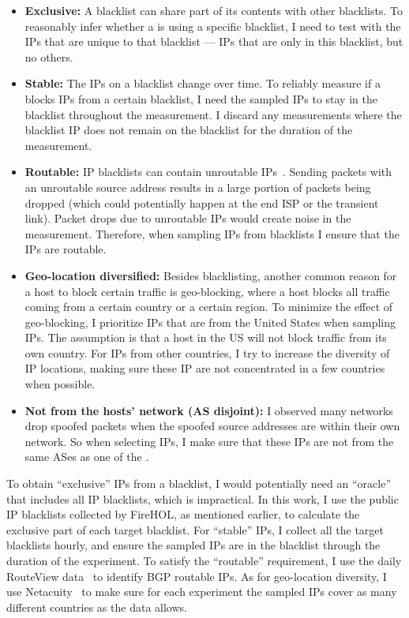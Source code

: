 \begin{itemize}
    \item \textbf{Exclusive:}
    A blacklist can share part of its contents with other blacklists. To
    reasonably infer whether a {} is using a specific blacklist, I
    need to test with the IPs that are unique to that blacklist --- IPs that are
    only in this blacklist, but no others.

    \item \textbf{Stable:}
    The IPs on a blacklist change over time. To reliably measure if a
    {} blocks IPs from a certain blacklist, I need the
    sampled IPs to stay in the blacklist throughout the measurement. I discard
    any measurements where the blacklist IP does not remain on the blacklist for
    the duration of the measurement.

    \item \textbf{Routable:}
    IP blacklists can contain unroutable IPs~\cite{li2019reading}. Sending
    packets with an unroutable source address results in a large portion of
    packets being dropped (which could potentially happen at the end ISP or 
    the transient link). Packet drops due to unroutable IPs would create 
    noise in the measurement. Therefore, when sampling IPs from blacklists I
    ensure that the IPs are routable.

    \item \textbf{Geo-location diversified:}
    Besides blacklisting, another common reason for a host to block certain
    traffic is geo-blocking, where a host blocks all traffic coming from a 
    certain country or a certain region. To minimize the effect of 
    geo-blocking, I prioritize IPs that are from the United States when 
    sampling IPs. The assumption is that a host in the US will not block 
    traffic from its own country. For IPs from other countries, I try to 
    increase the diversity of IP locations, making sure these IP are not 
    concentrated in a few countries when possible.

    \item \textbf{Not from the hosts' network (AS disjoint):}
    I observed many networks drop spoofed packets when the spoofed source 
    addresses are within their own network. So when selecting IPs, I make 
    sure that these IPs are not from the same ASes as one of the {}.

\end{itemize}

To obtain ``exclusive'' IPs from a blacklist, I would potentially need an
``oracle'' that includes all IP blacklists, which is impractical. In this work,
I use the public IP blacklists collected by FireHOL, as mentioned earlier, to calculate the
exclusive part of each target blacklist. For ``stable'' IPs, I
collect all the target blacklists hourly, and ensure the sampled IPs are in
the blacklist through the duration of the experiment. To satisfy the
``routable'' requirement, I use the daily RouteView data~\cite{Routeview}
to identify BGP routable IPs. As for geo-location diversity, I use
Netacuity~\cite{netacuity} to make sure for each experiment the sampled IPs
cover as many different countries as the data allows.
